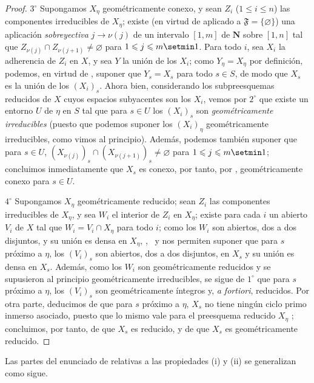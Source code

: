 \begin{proof}
$3^\circ$ Supongamos $X_\eta$ geométricamente conexo, y sean $Z_i$ ($1\leqslant i\leqslant n$) las componentes irreducibles de $X_\eta$; existe (en virtud de  aplicado a $\mathfrak F=\{\varnothing\}$) una aplicación \emph{sobreyectiva} $j\to\nu(j)$ de un intervalo $[1,m]$ de $\mathbf{N}$ sobre $[1,n]$ tal que $Z_{\nu(j)}\cap Z_{\nu(j+1)}\neq\varnothing$ para $1\leqslant j\leqslant m\setmin 1$.
Para todo $i$, sea $X_i$ la adherencia de $Z_i$ en $X$, y sea $Y$ la unión de los $X_i$; como $Y_\eta=X_\eta$ por definición, podemos, en virtud de , suponer que $Y_s=X_s$ para todo $s\in S$, de modo que $X_s$ es la unión de los $(X_i)_s$.
Ahora bien, considerando los subpreesquemas reducidos de $X$ cuyos espacios subyacentes son los $X_i$, vemos por $2^\circ$ que existe un entorno $U$ de $\eta$ en $S$ tal que para $s\in U$ los $(X_i)_s$ son \emph{geométricamente irreducibles} (puesto que podemos suponer los $(X_i)_\eta$ geométricamente irreducibles, como vimos al principio).
Además, podemos también suponer que para $s\in U$, $(X_{\nu(j)})_s\cap(X_{\nu(j+1)})_s\neq\varnothing$  para $1\leqslant j\leqslant m\setmin 1$; concluimos inmediatamente que $X_s$ es conexo, por tanto, por , geométricamente conexo para $s\in U$.

$4^\circ$ Supongamos $X_\eta$ geométricamente reducido; sean $Z_i$ las componentes irreducibles de $X_\eta$, y sea $W_i$ el interior de $Z_i$ en $X_\eta$; existe para cada $i$ un abierto $V_i$ de $X$ tal que $W_i=V_i\cap X_\eta$ para todo $i$; como los $W_i$ son abiertos, dos a dos disjuntos, y su unión es densa en $X_\eta$, ,~ y  nos permiten suponer que para $s$ próximo a $\eta$, los $(V_i)_s$ son abiertos, dos a dos disjuntos, en $X_s$ y su unión es densa en $X_s$.
Además, como los $W_i$ son geométricamente reducidos y se supusieron al principio geométricamente irreducibles, se sigue de $1^\circ$ que para $s$ próximo a $\eta$, los $(V_i)_s$ son geométricamente íntegros y, \emph{a fortiori}, reducidos.
Por otra parte, deducimos de  que para $s$ próximo a $\eta$, $X_s$ no tiene ningún ciclo primo inmerso asociado, puesto que lo mismo vale para el preesquema reducido $X_\eta$ ; concluimos, por tanto, de  que $X_s$ es reducido, y de  que $X_s$ es geométricamente reducido.
\end{proof}


Las partes del enunciado de  relativas a las propiedades (i) y (ii) se generalizan como sigue.


